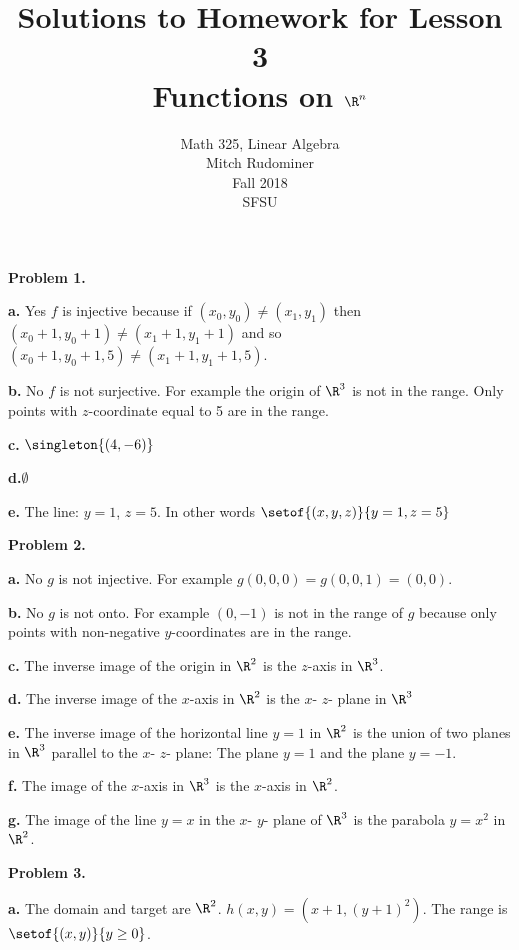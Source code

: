 \documentclass[oneside,12pt]{amsart}
\begin{document}
\title{Solutions to Homework for Lesson 3 \\ Functions on $\R^n$}
\author{Math 325, Linear Algebra \\ Mitch Rudominer \\ Fall 2018 \\ SFSU }
\date{}

\maketitle


\textbf{Problem 1.}

\textbf{a.} Yes $f$ is injective because if $(x_0, y_0) \not= (x_1, y_1)$
then $(x_0 +1 , y_0 +1) \not= (x_1 +1 , y_1 +1)$ and so
 $(x_0 +1 , y_0 +1, 5) \not= (x_1 +1 , y_1 +1, 5)$.


\textbf{b.} No $f$ is not surjective. For example the origin of $\R^3$ is not in
the range. Only points with $z$-coordinate equal to 5 are in the range.


\textbf{c.} $\singleton{(4, -6)}$


\textbf{d.}$\emptyset$


\textbf{e.} The line: $y=1$, $z=5$. In other words $\setof{(x,y,z)}{y=1, z=5}$

\medskip

\textbf{Problem 2.}

\textbf{a.} No $g$ is not injective. For example
$g(0,0,0) = g(0, 0,1) = (0,0)$.


\textbf{b.} No $g$ is not onto. For example $(0, -1)$ is not in the range of
$g$ because only points with non-negative $y$-coordinates are in the range.


\textbf{c.} The inverse image of the origin in $\R^2$ is the $z$-axis in $\R^3$.


\textbf{d.} The inverse image of the $x$-axis in $\R^2$ is the $x$- $z$- plane
in $\R^3$

\textbf{e.} The inverse image of the horizontal line $y=1$ in $\R^2$ is
the union of two planes in $\R^3$ parallel to the $x$- $z$- plane: The
plane $y=1$ and the plane $y=-1$.

\textbf{f.} The image of the $x$-axis in $\R^3$ is the $x$-axis in $\R^2$.

\textbf{g.} The  image of the line $y=x$ in the $x$- $y$- plane
of $\R^3$ is the parabola $y=x^2$ in $\R^2$.


\medskip

\textbf{Problem 3.}

\textbf{a.}  The domain and target are $\R^2$.
$h(x,y) = (x+1, (y+1)^2)$.
The range is $\setof{(x,y)}{y\geq 0}$.
\end{document}

